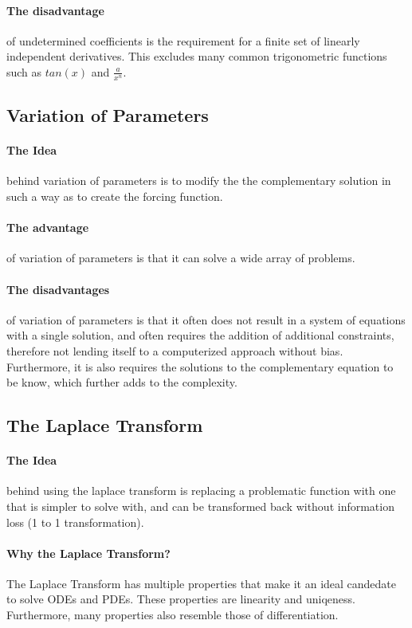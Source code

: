 \documentclass{article}
\begin{document}
\paragraph{The disadvantage} of undetermined coefficients is the requirement for a finite set of linearly independent derivatives. This excludes many common trigonometric functions such as $tan(x)$ and $\frac{a}{x^n}$.

\subsection{Variation of Parameters}
\paragraph{The Idea} behind variation of parameters is to modify the the complementary solution in such a way as to create the forcing function.
\paragraph{The advantage} of variation of parameters is that it can solve a wide array of problems.
\paragraph{The disadvantages} of variation of parameters is that it often does not result in a system of equations with a single solution, and often requires the addition of additional constraints, therefore not lending itself to a computerized approach without bias. Furthermore, it is also requires the solutions to the complementary equation to be know, which further adds to the complexity.

\subsection{The Laplace Transform}
\paragraph{The Idea} behind using the laplace transform is replacing a problematic function with one that is simpler to solve with, and can be transformed back without information loss (1 to 1 transformation).
\paragraph{Why the Laplace Transform?} The Laplace Transform has multiple properties that make it an ideal candedate to solve ODEs and PDEs. These properties are linearity and uniqeness. Furthermore, many properties also resemble those of differentiation.
\end{document}
